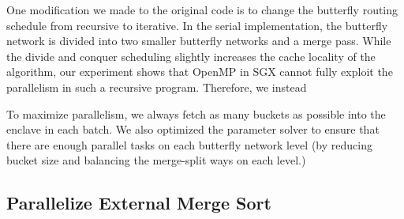 \documentclass{article}
\begin{document}
One modification we made to the original code is to change the butterfly routing schedule from recursive to iterative. In the serial implementation, the butterfly network is divided into two smaller butterfly networks and a merge pass. While the divide and conquer scheduling slightly increases the cache locality of the algorithm, our experiment shows that OpenMP in SGX cannot fully exploit the parallelism in such a recursive program. Therefore, we instead 

To maximize parallelism, we always fetch as many buckets as possible into the enclave in each batch. We also optimized the parameter solver to ensure that there are enough parallel tasks on each butterfly network level (by reducing bucket size and balancing the merge-split ways on each level.)

\subsection{Parallelize External Merge Sort}
\end{document}
